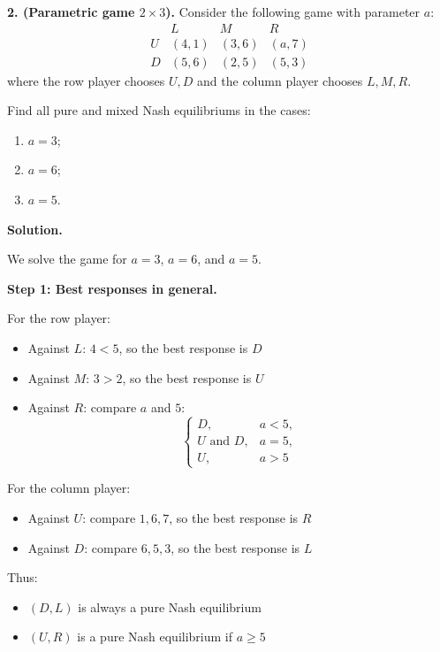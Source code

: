 \textbf{2. (Parametric game \(2\times 3\)).}
Consider the following game with parameter \(a\):
\[
\begin{array}{c|ccc}
 & L & M & R\\
\hline
U & (4,1) & (3,6) & (a,7)\\
D & (5,6) & (2,5) & (5,3)
\end{array}
\]
where the row player chooses \(U,D\) and the column player chooses \(L,M,R\).

Find all pure and mixed Nash equilibriums in the cases:
\begin{enumerate}
\item[(a)] \(a=3\);
\item[(b)] \(a=6\);
\item[(c)] \(a=5\).
\end{enumerate}

\textbf{Solution.}

We solve the game for \(a=3\), \(a=6\), and \(a=5\).

\textbf{Step 1: Best responses in general.}

For the row player:

\begin{itemize}
\item Against \(L\): \(4<5\), so the best response is \(D\)
\item Against \(M\): \(3>2\), so the best response is \(U\)
\item Against \(R\): compare \(a\) and \(5\):
\[
\begin{cases}
D, & a<5,\\
U \text{ and } D, & a=5,\\
U, & a>5
\end{cases}
\]
\end{itemize}

For the column player:

\begin{itemize}
\item Against \(U\): compare \(1,6,7\), so the best response is \(R\)
\item Against \(D\): compare \(6,5,3\), so the best response is \(L\)
\end{itemize}

Thus:
\begin{itemize}
\item \((D,L)\) is always a pure Nash equilibrium
\item \((U,R)\) is a pure Nash equilibrium if \(a\ge 5\)
\end{itemize}


